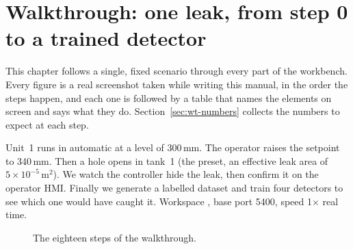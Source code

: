 \chapter{Walkthrough: one leak, from step 0 to a trained detector}
\label{ch:walkthrough}

This chapter follows a single, fixed scenario through every part of the
workbench. Every figure is a real screenshot taken while writing this manual,
in the order the steps happen, and each one is followed by a table that names
the elements on screen and says what they do. Section~\ref{sec:wt-numbers}
collects the numbers to expect at each step.

\begin{note}
Unit~1 runs in automatic at a level of 300\,mm. The operator raises the
setpoint to 340\,mm. Then a hole opens in tank~1 (the 
preset, an effective leak area of $5\times10^{-5}$\,m$^2$). We watch the
controller hide the leak, then confirm it on the operator HMI. Finally we
generate a labelled dataset and train four detectors to see which one would
have caught it. Workspace , base port 5400, speed
1$\times$ real time.
\end{note}

\begin{figure}[H]
\centering
{}
\caption{The eighteen steps of the walkthrough.}
\label{fig:wt-map}
\end{figure}

